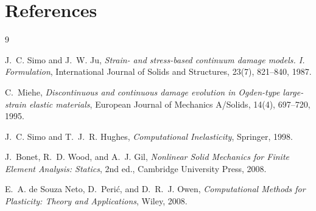\section{References}

\begin{thebibliography}{9}

J.~C. Simo and J.~W. Ju,
\emph{Strain- and stress-based continuum damage models. I. Formulation},
International Journal of Solids and Structures, 23(7), 821--840, 1987.

C.~Miehe,
\emph{Discontinuous and continuous damage evolution in Ogden-type large-strain
elastic materials},
European Journal of Mechanics A/Solids, 14(4), 697--720, 1995.

J.~C. Simo and T.~J.~R. Hughes,
\emph{Computational Inelasticity},
Springer, 1998.

J.~Bonet, R.~D. Wood, and A.~J. Gil,
\emph{Nonlinear Solid Mechanics for Finite Element Analysis: Statics},
2nd ed., Cambridge University Press, 2008.

E.~A. de Souza Neto, D.~Peri\'{c}, and D.~R.~J. Owen,
\emph{Computational Methods for Plasticity: Theory and Applications},
Wiley, 2008.

\end{thebibliography}
